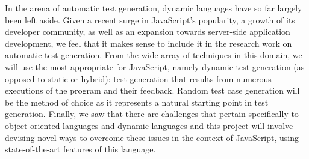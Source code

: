 In the arena of automatic test generation, dynamic languages have so far largely been left aside. Given a recent surge in JavaScript's popularity, a growth of its developer community, as well as an expansion towards server-side application development, we feel that it makes sense to include it in the research work on automatic test generation. From the wide array of techniques in this domain, we will use the most appropriate for JavaScript, namely dynamic test generation (as opposed to static or hybrid): test generation that results from numerous executions of the program and their feedback. Random test case generation will be the method of choice as it represents a natural starting point in test generation. Finally, we saw that there are challenges that pertain specifically to object-oriented languages and dynamic languages and this project will involve devising novel ways to overcome these issues in the context of JavaScript, using state-of-the-art features of this language.